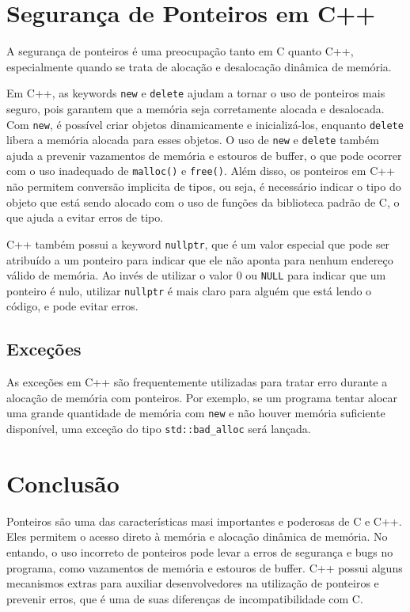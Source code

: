\documentclass[12pt]{article}
\begin{document}
\section{Segurança de Ponteiros em C++}

A segurança de ponteiros é uma preocupação tanto em C quanto C++, especialmente quando se trata de alocação e desalocação dinâmica de memória. 

Em C++, as keywords \texttt{new} e \texttt{delete} ajudam a tornar o uso de ponteiros mais seguro, pois garantem que a memória seja corretamente alocada e desalocada. Com \texttt{new}, é possível criar objetos dinamicamente e inicializá-los, enquanto \texttt{delete} libera a memória alocada para esses objetos. O uso de \texttt{new} e \texttt{delete} também ajuda a prevenir vazamentos de memória e estouros de buffer, o que pode ocorrer com o uso inadequado de \texttt{malloc()} e \texttt{free()}. Além disso, os ponteiros em C++ não permitem conversão implicita de tipos, ou seja, é necessário indicar o tipo do objeto que está sendo alocado com o uso de funções da biblioteca padrão de C, o que ajuda a evitar erros de tipo.

C++ também possui a keyword \texttt{nullptr}, que é um valor especial que pode ser atribuído a um ponteiro para indicar que ele não aponta para nenhum endereço válido de memória. Ao invés de utilizar o valor 0 ou \texttt{NULL} para indicar que um ponteiro é nulo, utilizar \texttt{nullptr} é mais claro para alguém que está lendo o código, e pode evitar erros.

\subsection{Exceções}
As exceções em C++ são frequentemente utilizadas para tratar erro durante a alocação de memória com ponteiros. Por exemplo, se um programa tentar alocar uma grande quantidade de memória com \texttt{new} e não houver memória suficiente disponível, uma exceção do tipo \texttt{std::bad\_alloc} será lançada.

\section{Conclusão}
Ponteiros são uma das características masi importantes e poderosas de C e C++. Eles permitem o acesso direto à memória e alocação dinâmica de memória. No entando, o uso incorreto de ponteiros pode levar a erros de segurança e bugs no programa, como vazamentos de memória e estouros de buffer. C++ possui alguns mecanismos extras para auxiliar desenvolvedores na utilização de ponteiros e prevenir erros, que é uma de suas diferenças de incompatibilidade com C. 
\end{document}
